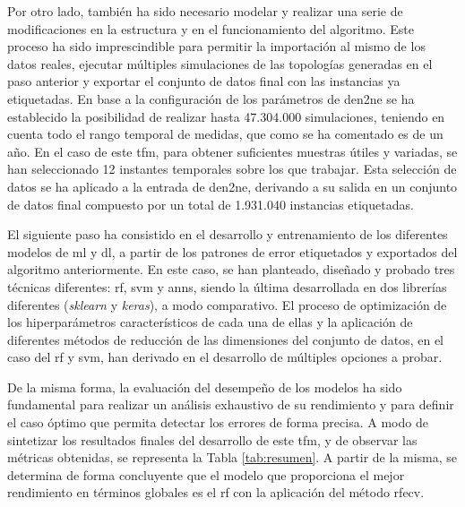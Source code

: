 \pagebreak

Por otro lado, también ha sido necesario modelar y realizar una serie de modificaciones en la estructura y en el funcionamiento del algoritmo. Este proceso ha sido imprescindible para permitir la importación al mismo de los datos reales, ejecutar múltiples simulaciones de las topologías generadas en el paso anterior y exportar el conjunto de datos final con las instancias ya etiquetadas. En base a la configuración de los parámetros de \gls{den2ne} se ha establecido la posibilidad de realizar hasta 47.304.000 simulaciones, teniendo en cuenta todo el rango temporal de medidas, que como se ha comentado es de un año. En el caso de este \gls{tfm}, para obtener suficientes muestras útiles y variadas, se han seleccionado 12 instantes temporales sobre los que trabajar. Esta selección de datos se ha aplicado a la entrada de \gls{den2ne}, derivando a su salida en un conjunto de datos final compuesto por un total de 1.931.040 instancias etiquetadas. 

\vspace{3mm}

El siguiente paso ha consistido en el desarrollo y entrenamiento de los diferentes modelos de \gls{ml} y \gls{dl}, a partir de los patrones de error etiquetados y exportados del algoritmo anteriormente. En este caso, se han planteado, diseñado y probado tres técnicas diferentes: \gls{rf}, \gls{svm} y \gls{ann}s, siendo la última desarrollada en dos librerías diferentes (\textit{sklearn} y \textit{keras}), a modo comparativo. El proceso de optimización de los hiperparámetros característicos de cada una de ellas y la aplicación de diferentes métodos de reducción de las dimensiones del conjunto de datos, en el caso del \gls{rf} y \gls{svm}, han derivado en el desarrollo de múltiples opciones a probar. 

\vspace{3mm}

De la misma forma, la evaluación del desempeño de los modelos ha sido fundamental para realizar un análisis exhaustivo de su rendimiento y para definir el caso óptimo que permita detectar los errores de forma precisa. A modo de sintetizar los resultados finales del desarrollo de este \gls{tfm}, y de observar las métricas obtenidas, se representa la Tabla \ref{tab:resumen}. A partir de la misma, se determina de forma concluyente que el modelo que proporciona el mejor rendimiento en términos globales es el \gls{rf} con la aplicación del método \gls{rfecv}.

\vspace{3mm}

